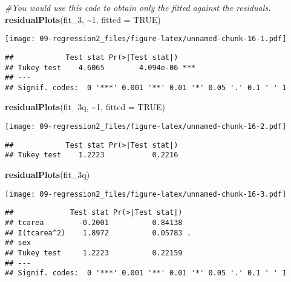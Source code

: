 \documentclass[
]{book}
\newenvironment{Shaded}{\begin{snugshade}}{\end{snugshade}}
\newcommand{\AttributeTok}[1]{\textcolor[rgb]{0.13,0.29,0.53}{#1}}
\newcommand{\CommentTok}[1]{\textcolor[rgb]{0.56,0.35,0.01}{\textit{#1}}}
\newcommand{\ConstantTok}[1]{\textcolor[rgb]{0.56,0.35,0.01}{#1}}
\newcommand{\DecValTok}[1]{\textcolor[rgb]{0.00,0.00,0.81}{#1}}
\newcommand{\FunctionTok}[1]{\textcolor[rgb]{0.13,0.29,0.53}{\textbf{#1}}}
\newcommand{\NormalTok}[1]{#1}
\newcommand{\SpecialCharTok}[1]{\textcolor[rgb]{0.81,0.36,0.00}{\textbf{#1}}}
\begin{document}
\begin{Shaded}
\begin{Highlighting}[]
\CommentTok{\#You would use this code to obtain only the fitted against the residuals.}
\FunctionTok{residualPlots}\NormalTok{(fit\_3, }\SpecialCharTok{\textasciitilde{}}\DecValTok{1}\NormalTok{, }\AttributeTok{fitted =} \ConstantTok{TRUE}\NormalTok{)}
\end{Highlighting}
\end{Shaded}

\texttt{[image: 09-regression2\_files/figure-latex/unnamed-chunk-16-1.pdf]}

\begin{verbatim}
##            Test stat Pr(>|Test stat|)    
## Tukey test    4.6065        4.094e-06 ***
## ---
## Signif. codes:  0 '***' 0.001 '**' 0.01 '*' 0.05 '.' 0.1 ' ' 1
\end{verbatim}

\begin{Shaded}
\begin{Highlighting}[]
\FunctionTok{residualPlots}\NormalTok{(fit\_3q, }\SpecialCharTok{\textasciitilde{}}\DecValTok{1}\NormalTok{, }\AttributeTok{fitted =} \ConstantTok{TRUE}\NormalTok{)}
\end{Highlighting}
\end{Shaded}

\texttt{[image: 09-regression2\_files/figure-latex/unnamed-chunk-16-2.pdf]}

\begin{verbatim}
##            Test stat Pr(>|Test stat|)
## Tukey test    1.2223           0.2216
\end{verbatim}

\begin{Shaded}
\begin{Highlighting}[]
\FunctionTok{residualPlots}\NormalTok{(fit\_3q)}
\end{Highlighting}
\end{Shaded}

\texttt{[image: 09-regression2\_files/figure-latex/unnamed-chunk-16-3.pdf]}

\begin{verbatim}
##             Test stat Pr(>|Test stat|)  
## tcarea        -0.2001          0.84138  
## I(tcarea^2)    1.8972          0.05783 .
## sex                                     
## Tukey test     1.2223          0.22159  
## ---
## Signif. codes:  0 '***' 0.001 '**' 0.01 '*' 0.05 '.' 0.1 ' ' 1
\end{verbatim}
\end{document}
